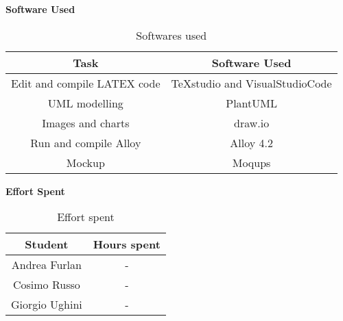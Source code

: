\begin{flushleft}
\textbf{Software Used}
\end{flushleft}
\begin{table}[htp]
	\centering
		\begin{tabular}{|c|c|}
			\hline
			Task&Software Used\\
			\hline
			Edit and compile LATEX code&TeXstudio and VisualStudioCode\\
			\hline
			UML modelling&PlantUML\\
			\hline
			Images and charts&draw.io\\
			\hline
			Run and compile Alloy&Alloy 4.2\\
			\hline
			Mockup&Moqups\\
			\hline
		\end{tabular}
	\caption{Softwares used} 
\end{table}
\begin{flushleft}
\textbf{Effort Spent}
\end{flushleft}
\begin{table}[htp]
	\centering
		\begin{tabular}{|c|c|}
			\hline
			Student&Hours spent\\
			\hline
			Andrea Furlan&-\\
			\hline
			Cosimo Russo&-\\
			\hline
			Giorgio Ughini&-\\
			\hline
		\end{tabular}
	\caption{Effort spent} 
\end{table}